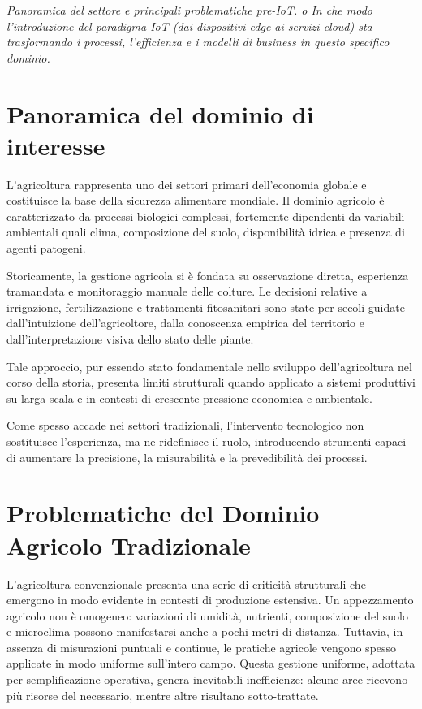 \begin{center}
	\textit{Panoramica del settore e principali problematiche pre-IoT. 
		o In che modo l'introduzione del paradigma IoT (dai dispositivi edge ai servizi 
		cloud) sta trasformando i processi, l'efficienza e i modelli di business in questo 
		specifico dominio.}
\end{center}


\section{Panoramica del dominio di interesse}
L’agricoltura rappresenta uno dei settori primari dell’economia globale e costituisce la base della sicurezza alimentare mondiale. Il dominio agricolo è caratterizzato da processi biologici complessi, fortemente dipendenti da variabili ambientali quali clima, composizione del suolo, disponibilità idrica e presenza di agenti patogeni.

Storicamente, la gestione agricola si è fondata su osservazione diretta, esperienza tramandata e monitoraggio manuale delle colture. Le decisioni relative a irrigazione, fertilizzazione e trattamenti fitosanitari sono state per secoli guidate dall’intuizione dell’agricoltore, dalla conoscenza empirica del territorio e dall’interpretazione visiva dello stato delle piante.

Tale approccio, pur essendo stato fondamentale nello sviluppo dell’agricoltura nel corso della storia, presenta limiti strutturali quando applicato a sistemi produttivi su larga scala e in contesti di crescente pressione economica e ambientale.

Come spesso accade nei settori tradizionali, l’intervento tecnologico non sostituisce l’esperienza, ma ne ridefinisce il ruolo, introducendo strumenti capaci di aumentare la precisione, la misurabilità e la prevedibilità dei processi.

\section{Problematiche del Dominio Agricolo Tradizionale}
L’agricoltura convenzionale presenta una serie di criticità strutturali che emergono in modo evidente in contesti di produzione estensiva. Un appezzamento agricolo non è omogeneo: variazioni di umidità, nutrienti, composizione del suolo e microclima possono manifestarsi anche a pochi metri di distanza. Tuttavia, in assenza di misurazioni puntuali e continue, le pratiche agricole vengono spesso applicate in modo uniforme sull’intero campo. Questa gestione uniforme, adottata per semplificazione operativa, genera inevitabili inefficienze: alcune aree ricevono più risorse del necessario, mentre altre risultano sotto-trattate.\newline

